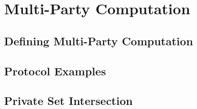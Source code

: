 \chapter{Multi-Party Computation}

\section{Defining Multi-Party Computation}

\section{Protocol Examples}

\section{Private Set Intersection}
